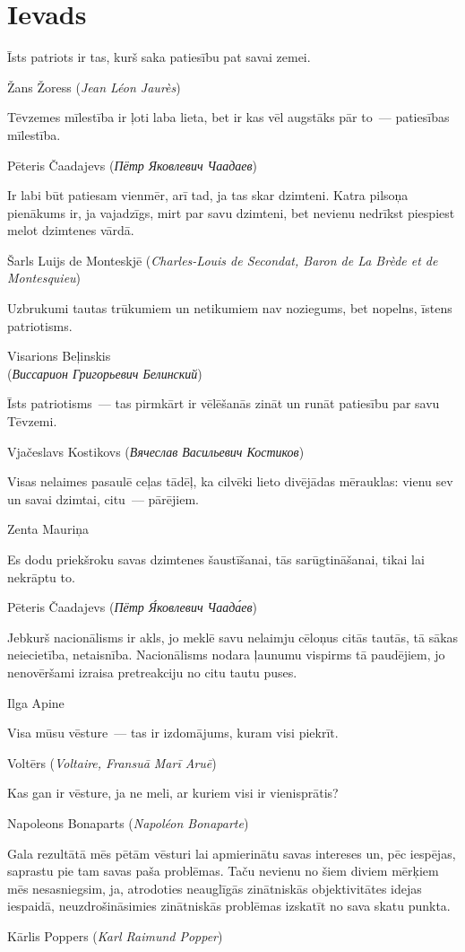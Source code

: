 \documentclass[twoside,a5paper,12pt,fleqn,openany]{extbook}
\newcommand{\rutxti}[1]{\textit{\textrussian{#1}}}
\newcommand{\frtxti}[1]{\textit{\textfrench{#1}}}
\newcommand{\entxti}[1]{\textit{\textenglish{#1}}}
\begin{document}
\chapter*{Ievads}

\epigraph
{Īsts patriots ir tas, kurš saka patiesību pat savai zemei.}
{Žans Žoress (\frtxti{Jean Léon Jaurès})}

\epigraph
{Tēvzemes mīlestība ir ļoti laba lieta, bet ir kas vēl augstāks pār to~--- patiesības mīlestība.}
{Pēteris Čaadajevs (\rutxti{Пётр Яковлевич Чаадаев})}

\epigraph
{Ir labi būt patiesam vienmēr, arī tad, ja tas skar dzimteni. Katra pilsoņa pienākums ir, ja vajadzīgs, mirt par savu dzimteni, bet nevienu nedrīkst piespiest melot dzimtenes vārdā.}
{Šarls Luijs de Monteskjē (\frtxti{Charles-Louis de Secondat, Baron de La Brède et de Montesquieu})}

\epigraph
{Uzbrukumi tautas trūkumiem un netikumiem nav noziegums, bet nopelns, īstens patriotisms.}
{Visarions Beļinskis\\(\rutxti{Виссарион Григорьевич Белинский})}

\newpage

\epigraph
{Īsts patriotisms~--- tas pirmkārt ir vēlēšanās zināt un runāt patiesību par savu Tēvzemi.}
{Vjačeslavs Kostikovs (\rutxti{Вячеслав Васильевич Костиков})}

\epigraph
{Visas nelaimes pasaulē ceļas tādēļ, ka cilvēki lieto divējādas mērauklas: vienu sev un savai dzimtai, citu~--- pārējiem.}
{Zenta Mauriņa}

\epigraph
{Es dodu priekšroku savas dzimtenes šaustīšanai, tās sarūgtināšanai, tikai lai nekrāptu to.}
{Pēteris Čaadajevs (\rutxti{Пётр Я́ковлевич Чаада́ев})}

\epigraph
{Jebkurš nacionālisms ir akls, jo meklē savu nelaimju cēloņus citās tautās, tā sākas neiecietība, netaisnība. Nacionālisms nodara ļaunumu vispirms tā paudējiem, jo nenovēršami izraisa pretreakciju no citu tautu puses.}
{Ilga Apine}

\epigraph
{Visa mūsu vēsture~--- tas ir izdomājums, kuram visi piekrīt.}
{Voltērs (\frtxti{Voltaire, Fransuā Marī Aruē})}

\newpage

\epigraph
{Kas gan ir vēsture, ja ne meli, ar kuriem visi ir vienisprātis?}
{Napoleons Bonaparts (\frtxti{Napoléon Bonaparte})}

\epigraph
{Gala rezultātā mēs pētām vēsturi lai apmierinātu savas intereses un, pēc iespējas, saprastu pie tam savas paša problēmas. Taču nevienu no šiem diviem mērķiem mēs nesasniegsim, ja, atrodoties neauglīgās zinātniskās objektivitātes idejas iespaidā, neuzdrošināsimies zinātniskās problēmas izskatīt no sava skatu punkta.}
{Kārlis Poppers (\entxti{Karl Raimund Popper})}
\end{document}
